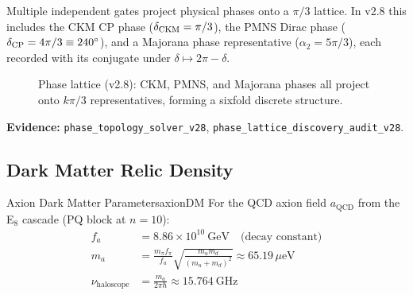 Multiple independent gates project physical phases onto a $\pi/3$ lattice.
In v2.8 this includes the CKM CP phase ($\delta_{\rm CKM}=\pi/3$), the PMNS Dirac phase ($\delta_{\rm CP}=4\pi/3\equiv 240^\circ$), and a Majorana phase representative ($\alpha_2=5\pi/3$), each recorded with its conjugate under $\delta\mapsto 2\pi-\delta$.

\begin{figure}[H]
\centering
{}
\caption{Phase lattice (v2.8): CKM, PMNS, and Majorana phases all project onto $k\pi/3$ representatives, forming a sixfold discrete structure.}
\label{fig:phase-lattice}
\end{figure}

\textbf{Evidence:} \texttt{phase\_topology\_solver\_v28}, \texttt{phase\_lattice\_discovery\_audit\_v28}.

\subsection{Dark Matter Relic Density}

\begin{theorem}{Axion Dark Matter Parameters}{axionDM}
For the QCD axion field $a_{\text{QCD}}$ from the E$_8$ cascade (PQ block at $n = 10$):
\begin{align}
    f_a &= 8.86 \times 10^{10}~\text{GeV} \quad \text{(decay constant)}\\
    m_a &= \frac{m_\pi f_\pi}{f_a}\sqrt{\frac{m_u m_d}{(m_u + m_d)^2}} \approx 65.19\,\mu\text{eV}\\
    \nu_{\text{haloscope}} &= \frac{m_a}{2\pi\hbar} \approx 15.764~\text{GHz}
\end{align}
\end{theorem}

